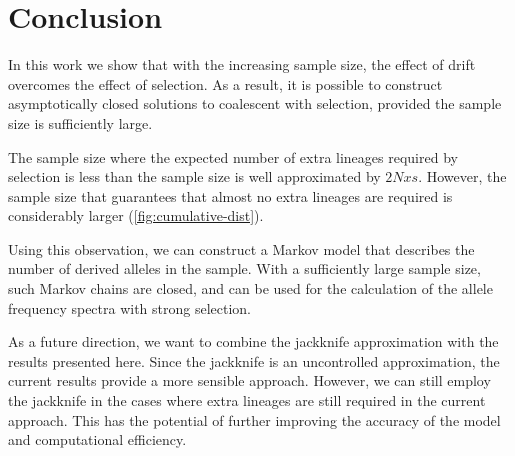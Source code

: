 \documentclass[review]{elsarticle}
\begin{document}
\section{Conclusion}
\label{sec:conclusion}

In this work we show that with the increasing sample size, the effect of drift overcomes the effect
of selection. As a result, it is possible to construct asymptotically closed solutions to coalescent
with selection, provided the sample size is sufficiently large.

The sample size where the expected number of extra lineages required by selection is less than the
sample size is well approximated by $2Nxs$. However, the sample size that guarantees that almost no
extra lineages are required is considerably larger (\ref{fig:cumulative-dist}).

Using this observation, we can construct a Markov model that describes the number of derived alleles
in the sample. With a sufficiently large sample size, such Markov chains are closed, and can be used
for the calculation of the allele frequency spectra with strong selection.

As a future direction, we want to combine the jackknife approximation \cite{JouganousEtAl2017} with the
results presented here. Since the jackknife is an uncontrolled approximation, the current results
provide a more sensible approach. However, we can still employ the jackknife in the cases where
extra lineages are still required in the current approach. This has the potential of further
improving the accuracy of the model and computational efficiency.



\end{document}
